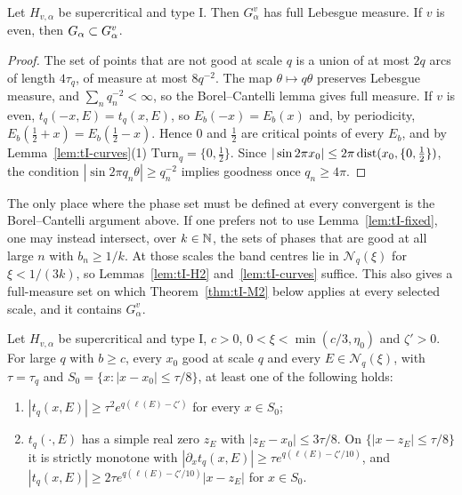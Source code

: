 \begin{lemma}\label{lem:tI-phaseset}
Let $H_{v,\alpha}$ be supercritical and type I. Then $G^v_\alpha$ has full Lebesgue measure. If $v$ is even, then $G_\alpha\subset G^v_\alpha$.
\end{lemma}

\begin{proof}
The set of points that are not good at scale $q$ is a union of at most $2q$ arcs of length $4\tau_q$, of measure at most $8q^{-2}$. The map $\theta\mapsto q\theta$ preserves Lebesgue measure, and $\sum_nq_n^{-2}<\infty$, so the Borel--Cantelli lemma gives full measure. If $v$ is even, $t_q(-x,E)=t_q(x,E)$, so $E_b(-x)=E_b(x)$ and, by periodicity, $E_b(\frac12+x)=E_b(\frac12-x)$. Hence $0$ and $\frac12$ are critical points of every $E_b$, and by Lemma~\ref{lem:tI-curves}(1) $\mathrm{Turn}_q=\{0,\frac12\}$. Since $|\sin2\pi x_0|\le2\pi\operatorname{dist}(x_0,\{0,\frac12\})$, the condition $|\sin2\pi q_n\theta|\ge q_n^{-2}$ implies goodness once $q_n\ge4\pi$.
\end{proof}

The only place where the phase set must be defined at every convergent is the Borel--Cantelli argument above. If one prefers not to use Lemma~\ref{lem:tI-fixed}, one may instead intersect, over $k\in\mathbb N$, the sets of phases that are good at all large $n$ with $b_n\ge1/k$. At those scales the band centres lie in $\mathcal N_q(\xi)$ for $\xi<1/(3k)$, so Lemmas~\ref{lem:tI-H2} and~\ref{lem:tI-curves} suffice. This also gives a full-measure set on which Theorem~\ref{thm:tI-M2} below applies at every selected scale, and it contains $G^v_\alpha$.

\begin{lemma}\label{lem:tI-NG}
Let $H_{v,\alpha}$ be supercritical and type I, $c>0$, $0<\xi<\min(c/3,\eta_0)$ and $\zeta'>0$. For large $q$ with $b\ge c$, every $x_0$ good at scale $q$ and every $E\in\mathcal N_q(\xi)$, with $\tau=\tau_q$ and $S_0=\{x:|x-x_0|\le\tau/8\}$, at least one of the following holds:
\begin{enumerate}
\item[(i)] $|t_q(x,E)|\ge\tau^2e^{q(\ell(E)-\zeta')}$ for every $x\in S_0$;
\item[(ii)] $t_q(\cdot,E)$ has a simple real zero $z_E$ with $|z_E-x_0|\le3\tau/8$. On $\{|x-z_E|\le\tau/8\}$ it is strictly monotone with $|\partial_xt_q(x,E)|\ge\tau e^{q(\ell(E)-\zeta'/10)}$, and $|t_q(x,E)|\ge2\tau e^{q(\ell(E)-\zeta'/10)}|x-z_E|$ for $x\in S_0$.
\end{enumerate}
\end{lemma}

